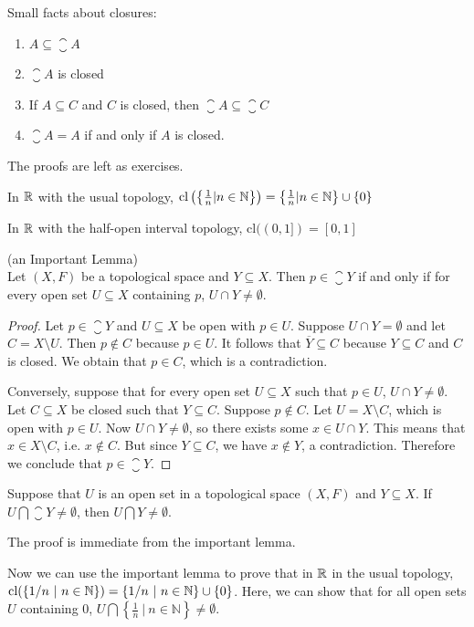 \begin{smallfact}
	Small facts about closures: 
	\begin{enumerate}
		\item $A \subseteq \closure{A}$ 
		\item $\closure{A}$ is closed 
		\item If $A \subseteq C$ and $C$ is closed, then $\closure{A}\subseteq\closure{C}$ 
		\item $\closure{A}=A$ if and only if $A$ is closed. 
	\end{enumerate}
\end{smallfact}
The proofs are left as exercises.
\begin{example}
	In $\mathbb R$ with the usual topology, $\mathrm{cl}\left(\left\{ \frac{1}{n}|n \in \mathbb N \right\}\right) = \left\{\frac{1}{n}|n \in \mathbb N \right\} \cup \{ 0\}$ 
\end{example}
\begin{example}
	In $\mathbb R$ with the half-open interval topology, $\mathrm{cl}((0,1])=[ 0, 1]$ 
\end{example}
\begin{lemma}
	(an Important Lemma)\\
	Let $(X,F)$ be a topological space and $Y \subseteq X$. Then $ p \in \closure{Y}$ if and only if for every open set $U\subseteq X$ containing $p$, $U \cap Y \neq\emptyset$. 
\end{lemma}
\begin{proof}
	Let $p \in \closure{Y}$ and $U\subseteq X$ be open with $p \in U$. Suppose $U \cap Y = \emptyset$ and let $C=X\setminus U$. Then $p\notin C$ because $p \in U$. It follows that $\overline{Y} \subseteq C$ because $Y \subseteq C$ and $C$ is closed. We obtain that $p \in C$, which is a contradiction.
	
	Conversely, suppose that for every open set $U\subseteq X$ such that $p \in U$, $U\cap Y \neq \emptyset$. Let $C\subseteq X$ be closed such that $Y \subseteq C$. Suppose $p \notin C$. Let $U=X\setminus C$, which is open with $p \in U$. Now $U \cap Y \neq\emptyset$, so there exists some $x \in U \cap Y$. This means that $x\in X\setminus C$, i.e. $x \notin C$. But since $Y \subseteq C$, we have $x \notin Y$, a contradiction. Therefore we conclude that $p \in \closure{Y}$. 
\end{proof}
\begin{corollary}
	Suppose that $U$ is an open set in a topological space $(X,F)$ and $Y \subseteq X$. If $U \bigcap \closure{Y}\neq\emptyset$, then $U \bigcap Y \neq \emptyset$. 
\end{corollary}

\proof The proof is immediate from the important lemma.

Now we can use the important lemma to prove that in $\mathbb R$ in the usual topology, $\mathrm{cl}(\{1/n\ |\ n\in\N\}) = \{1/n\ |\ n\in\N\}\cup\{0\}$. Here, we can show that for all open sets $U$ containing 0, $U \bigcap\left\{ \frac{1}{n}\ |\ n \in \mathbb{N} \right\} \neq \emptyset$.
